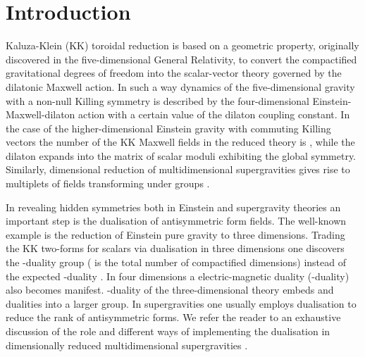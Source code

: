 \documentclass[a4paper,12pt]{article}
\begin{document}
\section{Introduction}
Kaluza-Klein (KK) toroidal reduction is based on a geometric
property, originally discovered in the five-dimensional General
Relativity, to convert the compactified gravitational degrees of
freedom into the scalar-vector theory governed by the dilatonic
Maxwell action. In such a way dynamics of the five-dimensional
gravity with a non-null Killing symmetry is described by the
four-dimensional Einstein-Maxwell-dilaton action with a certain
value of the dilaton coupling constant. In the case of the
higher-dimensional Einstein gravity with \coordHE{} commuting Killing
vectors the number of the KK Maxwell fields in the reduced theory
is \coordHE{}, while the dilaton expands into the \coordHE{} matrix of
scalar moduli exhibiting the \coordHE{} global symmetry.
Similarly, dimensional reduction of multidimensional
supergravities gives rise to multiplets of fields transforming
under \coordHE{} groups \cite{Ju81}.

In revealing hidden symmetries both in Einstein and supergravity
theories an important step is the dualisation of antisymmetric
form fields. The well-known example is the reduction of
Einstein pure gravity to three dimensions. Trading the KK
two-forms for scalars via dualisation in three dimensions one
discovers the \coordHE{}-duality group \coordHE{} (\coordHE{} is the total
number of compactified dimensions) instead of the expected
\coordHE{}-duality \coordHE{}. In four dimensions a \coordHE{}
electric-magnetic duality (\coordHE{}-duality) also becomes manifest.
\coordHE{}-duality of the three-dimensional theory embeds \coordHE{} and \coordHE{}
dualities  into a larger group. In supergravities one usually
employs dualisation to reduce the rank of antisymmetric forms.
We refer the reader to an exhaustive discussion of the role and
different ways of implementing the dualisation in dimensionally
reduced multidimensional supergravities
\cite{CrJuLuPo98a,CrJuLuPo98b}.
\end{document}
